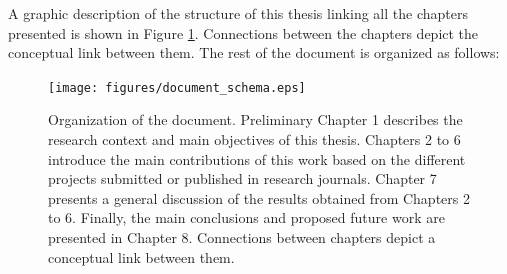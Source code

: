 A graphic description of the structure of this thesis linking all the chapters presented is shown in Figure \ref{document_structure}. Connections between the chapters depict the conceptual link between them. The rest of the document is organized as follows:

\begin{figure}[top]
  \begin{center}
    \vspace{-1cm}
    \texttt{[image: figures/document\_schema.eps]}
  \end{center}
    \caption[Organization of the document]{\small Organization of the document. Preliminary Chapter 1 describes the research context and main objectives of this thesis. Chapters 2 to 6 introduce the main contributions of this work based on the different projects submitted or published in research journals. Chapter 7 presents a general discussion of the results obtained from Chapters 2 to 6. Finally, the main conclusions and proposed future work are presented in Chapter 8. Connections between chapters depict a conceptual link between them.}
    \label{document_structure}
\end{figure}


